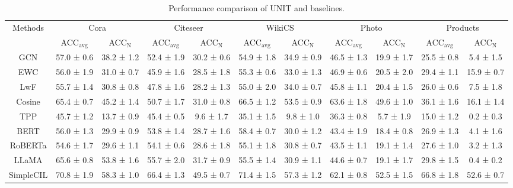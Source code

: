 \documentclass[sigconf]{acmart}
\begin{document}
\begin{table}
\setlength{\tabcolsep}{3.7pt}
\centering
\caption{Performance comparison of UNIT and baselines. 
}
\begin{tabular}{ccccccccccc}
\toprule
\multirow{2}{*}{Methods} & \multicolumn{2}{c}{Cora} & \multicolumn{2}{c}{Citeseer} & \multicolumn{2}{c}{WikiCS} & \multicolumn{2}{c}{Photo} & \multicolumn{2}{c}{Products} \\
\cmidrule(lr){2-3} \cmidrule(lr){4-5} \cmidrule(lr){6-7} \cmidrule(lr){8-9} 
\cmidrule(lr){10-11} 
 & ACC$_{\text{avg}}$         & ACC$_\text{N}$        & ACC$_{\text{avg}}$         & ACC$_\text{N}$          & ACC$_{\text{avg}}$         & ACC$_\text{N}$        & ACC$_{\text{avg}}$         & ACC$_\text{N}$           & ACC$_{\text{avg}}$         & ACC$_\text{N}$     \\
\midrule
GCN    & 57.0 ± 0.6 & 38.2 ± 1.2 & 52.4 ± 1.9 & 30.2 ± 0.6 & 54.9 ± 1.8 & 34.9 ± 0.9 & 46.5 ± 1.3 & 19.9 ± 1.7 & 25.5 ± 0.8 & 5.4 ± 1.5 \\
EWC    & 56.0 ± 1.9 & 31.0 ± 0.7 & 45.9 ± 1.6 & 28.5 ± 1.8 & 55.3 ± 0.6 & 33.0 ± 1.3 & 46.9 ± 0.6 & 20.5 ± 2.0 & 29.4 ± 1.1 & 15.9 ± 0.7 \\
LwF    & 55.7 ± 1.4 & 30.8 ± 0.8 & 47.8 ± 1.6 & 28.2 ± 1.3 & 55.0 ± 2.0 & 34.0 ± 0.7 & 45.8 ± 1.1 & 20.4 ± 1.5 & 26.0 ± 0.6 & 7.5 ± 1.8 \\
Cosine & 65.4 ± 0.7 & 45.2 ± 1.4 & 50.7 ± 1.7 & 31.0 ± 0.8 & 66.5 ± 1.2 & 53.5 ± 0.9 & 63.6 ± 1.8 & 49.6 ± 1.0 & 36.1 ± 1.6 & 16.1 ± 1.4 \\
TPP    & 45.7 ± 1.2 & 13.7 ± 0.9 & 45.4 ± 0.5 & 9.6 ± 1.7 & 35.1 ± 1.5 & 9.8 ± 1.0 & 36.3 ± 0.8 & 5.7 ± 1.9 & 15.0 ± 1.2 & 0.2 ± 0.3 \\
\midrule
BERT      & 56.0 ± 1.3 & 29.9 ± 0.9 & 53.8 ± 1.4 & 28.7 ± 1.6 & 58.4 ± 0.7 & 30.0 ± 1.2 & 43.4 ± 1.9 & 18.4 ± 0.8 & 26.9 ± 1.3 & 4.1 ± 1.6 \\
RoBERTa   & 54.6 ± 1.7 & 29.6 ± 1.1 & 54.1 ± 0.6 & 28.6 ± 1.8 & 55.1 ± 1.8 & 30.8 ± 0.7 & 43.5 ± 1.1 & 19.1 ± 1.4 & 27.6 ± 1.0 & 3.2 ± 1.3 \\
LLaMA     & 65.6 ± 0.8 & 53.8 ± 1.6 & 55.7 ± 2.0 & 31.7 ± 0.9 & 55.5 ± 1.4 & 30.9 ± 1.1 & 44.6 ± 0.7 & 19.1 ± 1.7 & 29.8 ± 1.5 & 0.4 ± 0.2 \\
SimpleCIL & 70.8 ± 1.9 & 58.3 ± 1.0 & 66.4 ± 1.3 & 49.5 ± 0.7 & 71.4 ± 1.5 & 57.3 ± 1.2 & 62.1 ± 0.8 & 52.5 ± 1.5 & 66.8 ± 1.8 & 52.6 ± 0.7 \\

\end{tabular}
\end{table}
\end{document}
